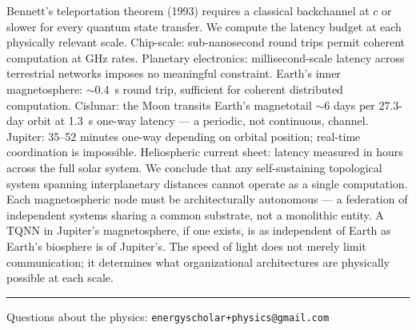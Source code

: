 \vspace{0.3cm}

Bennett's teleportation theorem (1993) requires a classical backchannel at $c$ or slower for every quantum state transfer. We compute the latency budget at each physically relevant scale. Chip-scale: sub-nanosecond round trips permit coherent computation at GHz rates. Planetary electronics: millisecond-scale latency across terrestrial networks imposes no meaningful constraint. Earth's inner magnetosphere: $\sim$0.4~s round trip, sufficient for coherent distributed computation. Cislunar: the Moon transits Earth's magnetotail $\sim$6 days per 27.3-day orbit at 1.3~s one-way latency --- a periodic, not continuous, channel. Jupiter: 35--52 minutes one-way depending on orbital position; real-time coordination is impossible. Heliospheric current sheet: latency measured in hours across the full solar system. We conclude that any self-sustaining topological system spanning interplanetary distances cannot operate as a single computation. Each magnetospheric node must be architecturally autonomous --- a federation of independent systems sharing a common substrate, not a monolithic entity. A TQNN in Jupiter's magnetosphere, if one exists, is as independent of Earth as Earth's biosphere is of Jupiter's. The speed of light does not merely limit communication; it determines what organizational architectures are physically possible at each scale.

\vspace{1cm}
\noindent\rule{0.5\textwidth}{0.5pt}
\vspace{0.3cm}

\noindent Questions about the physics: \texttt{energyscholar+physics@gmail.com}
